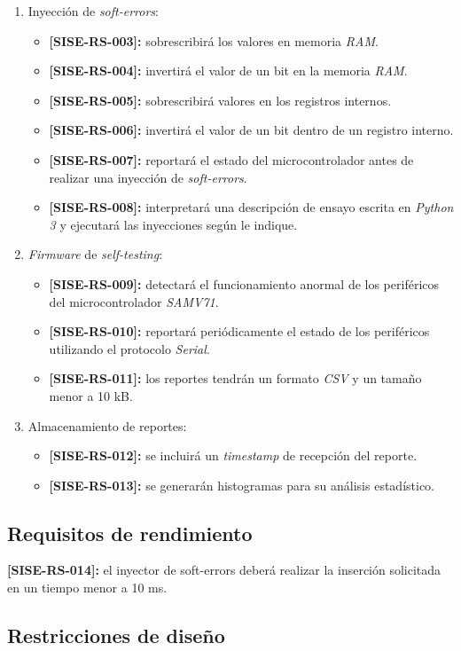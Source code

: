 \documentclass[
11pt, %
codirector, %
]{charter}
\def\codigo{SISE-RS}
\newcommand{\req}[1]{\textbf{[\codigo-#1]:}}
\begin{document}
\begin{enumerate}
	\item Inyección de \emph{soft-errors}:
	\begin{itemize}
		\item \req{003} sobrescribirá los valores en memoria \emph{RAM}.
		\item \req{004} invertirá el valor de un bit en la memoria \emph{RAM}.
		\item \req{005} sobrescribirá valores en los registros internos.
		\item \req{006} invertirá el valor de un bit dentro de un registro interno.
		\item \req{007} reportará el estado del microcontrolador antes de realizar una inyección de \emph{soft-errors}.
		\item \req{008} interpretará una descripción de ensayo escrita en \emph{Python 3} y ejecutará las inyecciones según le indique.
	\end{itemize}
	\item \emph{Firmware} de \emph{self-testing}:
	\begin{itemize}
		\item \req{009} detectará el funcionamiento anormal de los periféricos del microcontrolador \emph{SAMV71}.
		\item \req{010} reportará periódicamente el estado de los periféricos utilizando el protocolo \emph{Serial}.
		\item \req{011} los reportes tendrán un formato \emph{CSV} y un tamaño menor a 10 kB.
	\end{itemize}
	\item Almacenamiento de reportes:
	\begin{itemize}
		\item \req{012} se incluirá un \emph{timestamp} de recepción del reporte.
		\item \req{013} se generarán histogramas para su análisis estadístico.
	\end{itemize}
\end{enumerate}

\subsection{Requisitos de rendimiento}
\label{sub:rendimiento}

\req{014} el inyector de soft-errors deberá realizar la inserción solicitada en un tiempo menor a 10 ms.

\subsection{Restricciones de diseño}
\label{sub:restriccionesDiseño}
\end{document}
